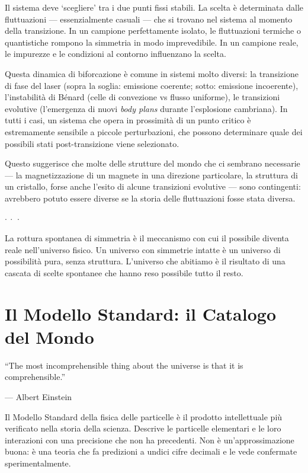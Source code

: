 \documentclass[12pt,a4paper,openany]{book}
\newcommand{\sezione}[1]{\vspace{1.2em}{\large\bfseries #1}\vspace{0.5em}\par}
\newcommand{\puntini}{\begin{center}$\cdot\ \cdot\ \cdot$\end{center}\vspace{0.3em}}
\begin{document}
Il sistema deve `scegliere' tra i due punti fissi stabili. La scelta è determinata dalle fluttuazioni --- essenzialmente casuali --- che si trovano nel sistema al momento della transizione. In un campione perfettamente isolato, le fluttuazioni termiche o quantistiche rompono la simmetria in modo imprevedibile. In un campione reale, le impurezze e le condizioni al contorno influenzano la scelta.

Questa dinamica di biforcazione è comune in sistemi molto diversi: la transizione di fase del laser (sopra la soglia: emissione coerente; sotto: emissione incoerente), l'instabilità di Bénard (celle di convezione vs flusso uniforme), le transizioni evolutive (l'emergenza di nuovi \textit{body plans} durante l'esplosione cambriana). In tutti i casi, un sistema che opera in prossimità di un punto critico è estremamente sensibile a piccole perturbazioni, che possono determinare quale dei possibili stati post-transizione viene selezionato.

Questo suggerisce che molte delle strutture del mondo che ci sembrano necessarie --- la magnetizzazione di un magnete in una direzione particolare, la struttura di un cristallo, forse anche l'esito di alcune transizioni evolutive --- sono contingenti: avrebbero potuto essere diverse se la storia delle fluttuazioni fosse stata diversa.

\puntini

La rottura spontanea di simmetria è il meccanismo con cui il possibile diventa reale nell'universo fisico. Un universo con simmetrie intatte è un universo di possibilità pura, senza struttura. L'universo che abitiamo è il risultato di una cascata di scelte spontanee che hanno reso possibile tutto il resto.

\chapter{Il Modello Standard: il Catalogo del Mondo}

\epigraph{``The most incomprehensible thing about the universe is that it is comprehensible.''}{--- Albert Einstein}

\sezione{Il catalogo più preciso mai costruito}

Il Modello Standard della fisica delle particelle è il prodotto intellettuale più verificato nella storia della scienza. Descrive le particelle elementari e le loro interazioni con una precisione che non ha precedenti. Non è un'approssimazione buona: è una teoria che fa predizioni a undici cifre decimali e le vede confermate sperimentalmente.
\end{document}
